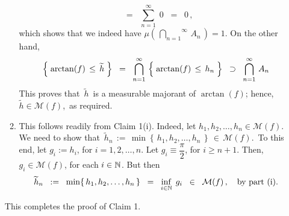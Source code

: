 \begin{enumerate}
\begin{enumerate}
\begin{equation*}
		\;\; = \;\;
			\overset{\infty}{\underset{n=1}{\sum}}\;0
		\;\; = \;\;
			0\,,
		\end{equation*}
		which shows that we indeed have $\mu\!\left(\,\overset{\infty}{\underset{n=1}{\bigcap}}\,A_{n}\,\right) = 1$.
		On the other hand,
		\begin{equation*}
		\left\{\;\arctan(f) \,\leq\, \widetilde{h}\;\right\}
		\;\; = \;\;
			\bigcap_{n=1}^{\infty}\,\left\{\;\arctan(f) \,\overset{{\color{white}.}}{\leq}\, h_{n}\;\right\}
		\;\; \supset \;\;
			\bigcap_{n=1}^{\infty}\,A_{n}
		\end{equation*}
		This proves that \,$\widetilde{h}$\, is a measurable majorant of $\arctan(f)$;
		hence, \,$\widetilde{h} \in \mathcal{M}(f)$,\, as required.
	\item
		This follows readily from Claim 1(i).
		Indeed, let $h_{1}, h_{2}, \ldots, h_{n} \in \mathcal{M}(f)$.
		We need to show that
		\,$\widetilde{h}_{n} \,:=\, \min\!\left\{\,h_{1},h_{2},\ldots,h_{n}\,\right\} \,\in\, \mathcal{M}(f)$.\,
		To this end, let $g_{i} := h_{i}$, for $i = 1,2,\ldots,n$. Let $g_{i} \equiv \dfrac{\pi}{2}$, for $i \geq n+1$.
		Then, $g_{i} \in \mathcal{M}(f)$, for each $i \in \mathbb{N}$.
		But then
		\begin{equation*}
		\widetilde{h}_{n}
		\;\; := \;\;
			\min\!\left\{\,h_{1},h_{2},\ldots,h_{n}\,\right\}
		\;\; = \;\;
			\underset{i\in\mathbb{N}}{\inf}\;\, g_{i}
		\;\; \in \;\;
			\mathcal{M}(f)\,,
			\quad
			\textnormal{by part (i)}.
		\end{equation*}
\end{enumerate}
This completes the proof of Claim 1.



\end{enumerate}
